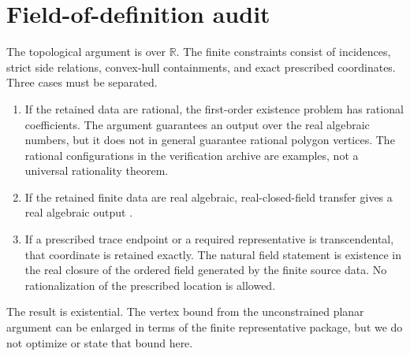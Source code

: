 \section{Field-of-definition audit}\label{app:field}

The topological argument is over $\mathbb R$.  The finite constraints consist
of incidences, strict side relations, convex-hull containments, and exact
prescribed coordinates.  Three cases must be separated.

\begin{enumerate}
\item If the retained data are rational, the first-order existence problem
      has rational coefficients.  The argument guarantees an output over the
      real algebraic numbers, but it does not in general guarantee rational
      polygon vertices.  The rational configurations in the verification
      archive are examples, not a universal rationality theorem.
\item If the retained finite data are real algebraic, real-closed-field
      transfer gives a real algebraic output \citep{BasuPollackRoy2006}.
\item If a prescribed trace endpoint or a required representative is
      transcendental, that coordinate is retained exactly.  The natural
      field statement is existence in the real closure of the ordered field
      generated by the finite source data.  No rationalization of the
      prescribed location is allowed.
\end{enumerate}

The result is existential.  The vertex bound from the unconstrained planar
argument can be enlarged in terms of the finite representative package, but
we do not optimize or state that bound here.
